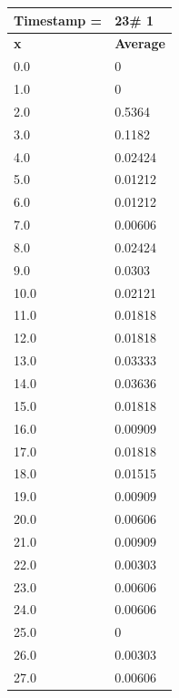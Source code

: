 \begin{tabular}{|l||l|}
\hline
\textbf{Timestamp =} & \textbf{23}\# 1\\\hline
	\textbf{x} & \textbf{Average} \\ \hline
\hline
	0.0 & 0 \\ \hline
	1.0 & 0 \\ \hline
	2.0 & 0.5364 \\ \hline
	3.0 & 0.1182 \\ \hline
	4.0 & 0.02424 \\ \hline
	5.0 & 0.01212 \\ \hline
	6.0 & 0.01212 \\ \hline
	7.0 & 0.00606 \\ \hline
	8.0 & 0.02424 \\ \hline
	9.0 & 0.0303 \\ \hline
	10.0 & 0.02121 \\ \hline
	11.0 & 0.01818 \\ \hline
	12.0 & 0.01818 \\ \hline
	13.0 & 0.03333 \\ \hline
	14.0 & 0.03636 \\ \hline
	15.0 & 0.01818 \\ \hline
	16.0 & 0.00909 \\ \hline
	17.0 & 0.01818 \\ \hline
	18.0 & 0.01515 \\ \hline
	19.0 & 0.00909 \\ \hline
	20.0 & 0.00606 \\ \hline
	21.0 & 0.00909 \\ \hline
	22.0 & 0.00303 \\ \hline
	23.0 & 0.00606 \\ \hline
	24.0 & 0.00606 \\ \hline
	25.0 & 0 \\ \hline
	26.0 & 0.00303 \\ \hline
	27.0 & 0.00606 \\ \hline
\end{tabular}

